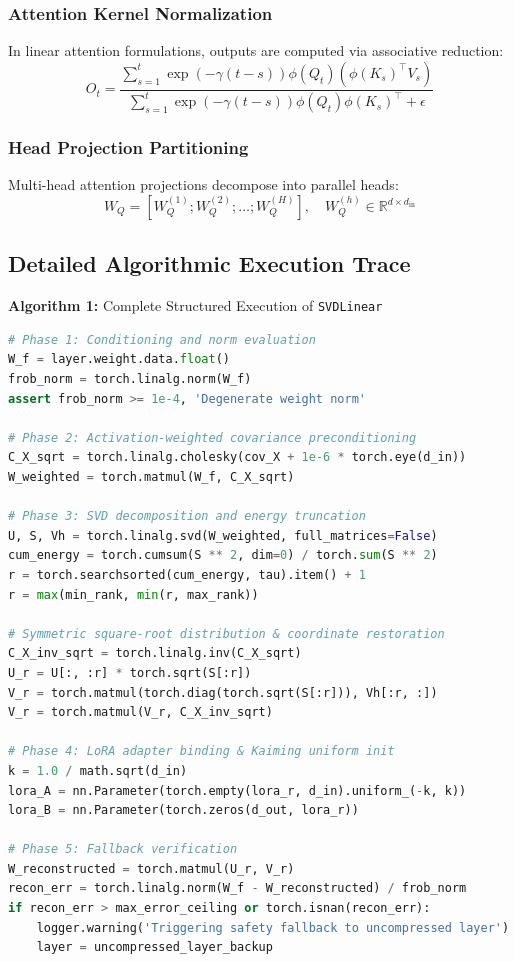 \subsubsection{Attention Kernel Normalization}
In linear attention formulations, outputs are computed via associative reduction:
\[
O_t = \frac{\sum_{s=1}^{t} \exp(-\gamma (t-s)) \phi(Q_t) (\phi(K_s)^\top V_s)}{\sum_{s=1}^{t} \exp(-\gamma (t-s)) \phi(Q_t) \phi(K_s)^\top + \epsilon}
\]

\subsubsection{Head Projection Partitioning}
Multi-head attention projections decompose into parallel heads:
\[
W_Q = [W_Q^{(1)}; W_Q^{(2)}; \dots; W_Q^{(H)}], \quad W_Q^{(h)} \in \mathbb{R}^{d \times d_{\text{in}}}
\]

\subsection{Detailed Algorithmic Execution Trace}

\textbf{Algorithm 1:} Complete Structured Execution of \texttt{SVDLinear}
\begin{lstlisting}[language=Python]
# Phase 1: Conditioning and norm evaluation
W_f = layer.weight.data.float()
frob_norm = torch.linalg.norm(W_f)
assert frob_norm >= 1e-4, 'Degenerate weight norm'

# Phase 2: Activation-weighted covariance preconditioning
C_X_sqrt = torch.linalg.cholesky(cov_X + 1e-6 * torch.eye(d_in))
W_weighted = torch.matmul(W_f, C_X_sqrt)

# Phase 3: SVD decomposition and energy truncation
U, S, Vh = torch.linalg.svd(W_weighted, full_matrices=False)
cum_energy = torch.cumsum(S ** 2, dim=0) / torch.sum(S ** 2)
r = torch.searchsorted(cum_energy, tau).item() + 1
r = max(min_rank, min(r, max_rank))

# Symmetric square-root distribution & coordinate restoration
C_X_inv_sqrt = torch.linalg.inv(C_X_sqrt)
U_r = U[:, :r] * torch.sqrt(S[:r])
V_r = torch.matmul(torch.diag(torch.sqrt(S[:r])), Vh[:r, :])
V_r = torch.matmul(V_r, C_X_inv_sqrt)

# Phase 4: LoRA adapter binding & Kaiming uniform init
k = 1.0 / math.sqrt(d_in)
lora_A = nn.Parameter(torch.empty(lora_r, d_in).uniform_(-k, k))
lora_B = nn.Parameter(torch.zeros(d_out, lora_r))

# Phase 5: Fallback verification
W_reconstructed = torch.matmul(U_r, V_r)
recon_err = torch.linalg.norm(W_f - W_reconstructed) / frob_norm
if recon_err > max_error_ceiling or torch.isnan(recon_err):
    logger.warning('Triggering safety fallback to uncompressed layer')
    layer = uncompressed_layer_backup
\end{lstlisting}

